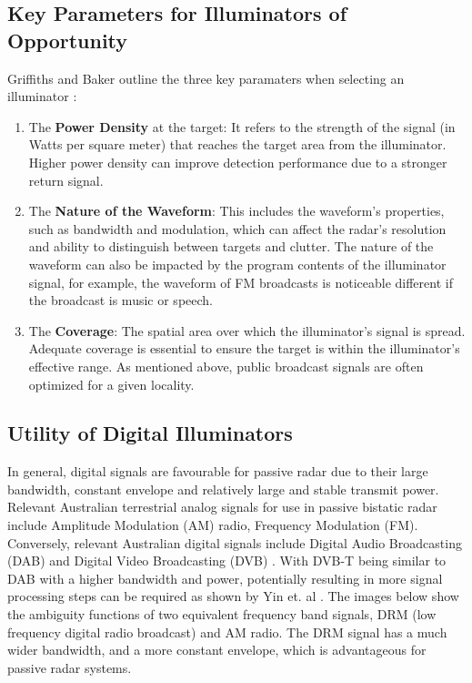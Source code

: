\subsection{Key Parameters for Illuminators of Opportunity}
Griffiths and Baker outline the three key paramaters when selecting an illuminator \cite{INTRO2017}:
\begin{enumerate}[label=\arabic*.]
    \item The \textbf{Power Density} at the target: It refers to the strength of the signal (in Watts per square meter) that reaches the target area from the illuminator. Higher power density can improve detection performance due to a stronger return signal.
    \item The \textbf{Nature of the Waveform}: This includes the waveform's properties, such as bandwidth and modulation, which can affect the radar's resolution and ability to distinguish between targets and clutter. The nature of the waveform can also be impacted by the program contents of the illuminator signal, for example, the waveform of FM broadcasts is noticeable different if the broadcast is music or speech.
    \item The \textbf{Coverage}: The spatial area over which the illuminator's signal is spread. Adequate coverage is essential to ensure the target is within the illuminator's effective range. As mentioned above, public broadcast signals are often optimized for a given locality.
\end{enumerate}

\subsection{Utility of Digital Illuminators}
In general, digital signals are favourable for passive radar due to their large bandwidth, constant envelope and relatively large and stable transmit power. Relevant Australian terrestrial analog signals for use in passive bistatic radar include Amplitude Modulation (AM) radio, Frequency Modulation (FM). Conversely, relevant Australian digital signals include Digital Audio Broadcasting (DAB) and Digital Video Broadcasting (DVB) \cite{DABfeatures}. With DVB-T being similar to DAB with a higher bandwidth and power, potentially resulting in more signal processing steps can be required as shown by Yin et. al \cite{DVBnoise}. The images below show the ambiguity functions of two equivalent frequency band signals, DRM (low frequency digital radio broadcast) and AM radio. The DRM signal has a much wider bandwidth, and a more constant envelope, which is advantageous for passive radar systems.

